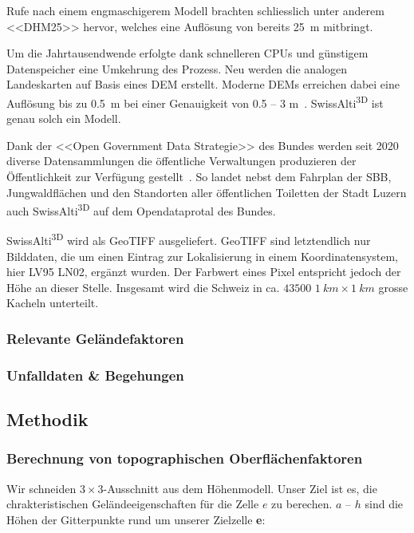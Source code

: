 Rufe nach einem engmaschigerem Modell brachten schliesslich unter anderem <<DHM25>> hervor, welches eine Auflösung von bereits \qty{25}{m} mitbringt.~\cite{swisstopohistdem}

Um die Jahrtausendwende erfolgte dank schnelleren CPUs und günstigem Datenspeicher eine Umkehrung des Prozess. Neu werden die analogen Landeskarten auf Basis eines DEM erstellt. Moderne DEMs erreichen dabei eine Auflösung bis zu \qty{0.5}{m} bei einer Genauigkeit von 0.5 -- 3 \unit{m}~\cite{alti3dprod}. SwissAlti\textsuperscript{3D} ist genau solch ein Modell.

Dank der <<Open Government Data Strategie>> des Bundes werden seit 2020 diverse Datensammlungen die öffentliche Verwaltungen produzieren der Öffentlichkeit zur Verfügung gestellt~\cite{opendataswiss}.
So landet nebst dem Fahrplan der SBB, Jungwaldflächen und den Standorten aller öffentlichen Toiletten der Stadt Luzern auch  SwissAlti\textsuperscript{3D} auf dem Opendataprotal des Bundes.

SwissAlti\textsuperscript{3D} wird als GeoTIFF ausgeliefert. GeoTIFF sind letztendlich nur Bilddaten, die um einen Eintrag zur Lokalisierung in einem Koordinatensystem, hier LV95 LN02, ergänzt wurden. Der Farbwert eines Pixel entspricht jedoch der Höhe an dieser Stelle. Insgesamt wird die Schweiz in ca. $43500$ $\qty{1}{km} \times \qty{1}{km}$ grosse Kacheln unterteilt.~\cite{alti3dprod}

\subsubsection{Relevante Geländefaktoren}

\subsubsection{Unfalldaten \& Begehungen}


\subsection{Methodik}
\subsubsection{Berechnung von topographischen Oberflächenfaktoren}

Wir schneiden $3 \times 3$-Ausschnitt aus dem Höhenmodell. Unser Ziel ist es, die chrakteristischen Geländeeigenschaften für die Zelle $e$ zu berechen.
$a$ -- $h$ sind die Höhen der Gitterpunkte rund um unserer Zielzelle \textbf{e}:

